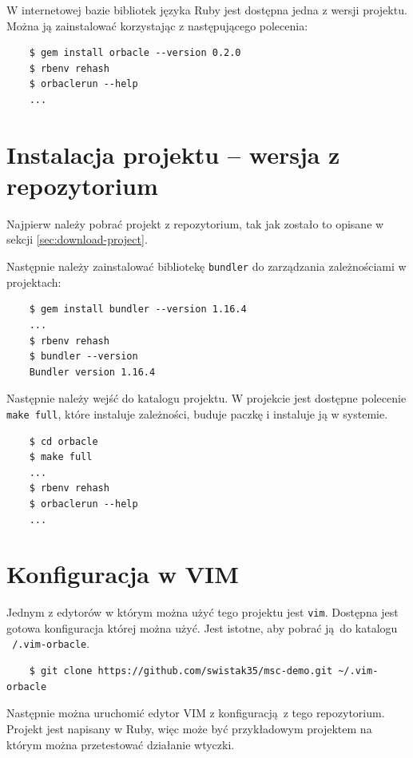 \documentclass[shortabstract,mgr]{iithesis}
\begin{document}
\begin{appendices}
W internetowej bazie bibliotek języka Ruby jest dostępna jedna z wersji projektu. Można ją zainstalować korzystając z następującego polecenia:

\begin{lstlisting}
    $ gem install orbacle --version 0.2.0
    $ rbenv rehash
    $ orbaclerun --help
    ...
\end{lstlisting}

\section{Instalacja projektu -- wersja z repozytorium}

Najpierw należy pobrać projekt z repozytorium, tak jak zostało to opisane w sekcji \ref{sec:download-project}.

Następnie należy zainstalować bibliotekę \texttt{bundler} do zarządzania zależnościami w projektach:

\begin{lstlisting}
    $ gem install bundler --version 1.16.4
    ...
    $ rbenv rehash
    $ bundler --version
    Bundler version 1.16.4
\end{lstlisting}

Następnie należy wejść do katalogu projektu. W projekcie jest dostępne polecenie \texttt{make full}, które instaluje zależności, buduje paczkę i instaluje ją w systemie.

\begin{lstlisting}
    $ cd orbacle
    $ make full
    ...
    $ rbenv rehash
    $ orbaclerun --help
    ...
\end{lstlisting}

\section{Konfiguracja w VIM}

Jednym z edytorów w którym można użyć tego projektu jest \texttt{vim}. Dostępna jest gotowa konfiguracja której można użyć. Jest istotne, aby pobrać ją do katalogu \texttt{~/.vim-orbacle}.

\begin{lstlisting}
    $ git clone https://github.com/swistak35/msc-demo.git ~/.vim-orbacle
\end{lstlisting}

Następnie można uruchomić edytor VIM z konfiguracją z tego repozytorium. Projekt jest napisany w Ruby, więc może być przykładowym projektem na którym można przetestować działanie wtyczki.


\end{appendices}
\end{document}
